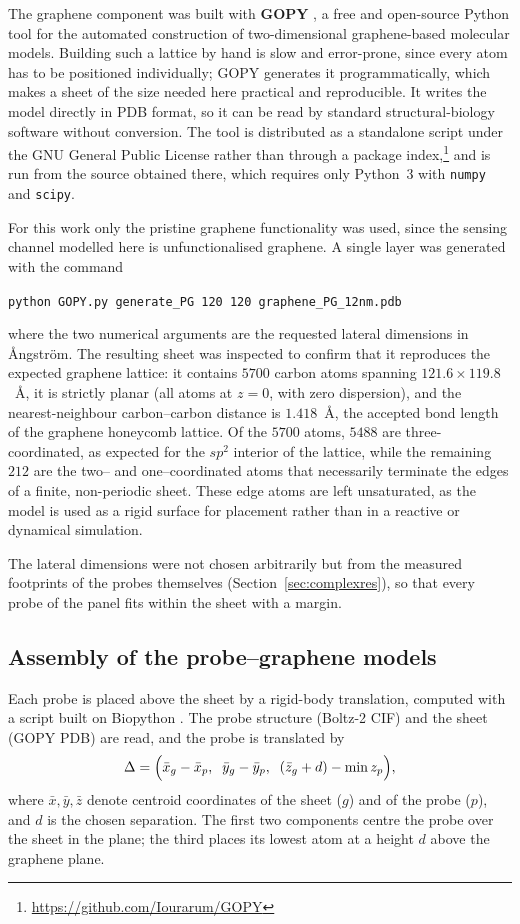 The graphene component was built with \textbf{GOPY} \citep{muraru2020}, a free and open-source
Python tool for the automated construction of two-dimensional graphene-based molecular models.
Building such a lattice by hand is slow and error-prone, since every atom has to be positioned
individually; GOPY generates it programmatically, which makes a sheet of the size needed here
practical and reproducible. It writes the model directly in PDB format, so it can be read by
standard structural-biology software without conversion. The tool is distributed as a standalone
script under the GNU General Public License rather than through a package
index,\footnote{\url{https://github.com/Iourarum/GOPY}} and is run from the source obtained there,
which requires only Python~3 with \texttt{numpy} and \texttt{scipy}.

For this work only the pristine graphene functionality was used, since the sensing channel modelled
here is unfunctionalised graphene. A single layer was generated with the command
\begin{center}
\texttt{python GOPY.py generate\_PG 120 120 graphene\_PG\_12nm.pdb}
\end{center}
where the two numerical arguments are the requested lateral dimensions in \AA{}ngstr\"om. The
resulting sheet was inspected to confirm that it reproduces the expected graphene lattice: it
contains $5700$ carbon atoms spanning $121.6 \times 119.8$~\AA{}, it is strictly planar (all atoms
at $z = 0$, with zero dispersion), and the nearest-neighbour carbon--carbon distance is
$1.418$~\AA{}, the accepted bond length of the graphene honeycomb lattice. Of the $5700$ atoms,
$5488$ are three-coordinated, as expected for the $sp^2$ interior of the lattice, while the
remaining $212$ are the two-- and one--coordinated atoms that necessarily terminate the edges of a
finite, non-periodic sheet. These edge atoms are left unsaturated, as the model is used as a rigid
surface for placement rather than in a reactive or dynamical simulation.

The lateral dimensions were not chosen arbitrarily but from the measured footprints of the probes
themselves (Section~\ref{sec:complexres}), so that every probe of the panel fits within the sheet
with a margin.

\subsection{Assembly of the probe--graphene models}

Each probe is placed above the sheet by a rigid-body translation, computed with a script built on
Biopython \citep{cock2009}. The probe structure (Boltz-2 CIF) and the sheet
(GOPY PDB) are read, and the probe is translated by
\[
\Delta = \Bigl(\bar{x}_{g}-\bar{x}_{p},\;\;
               \bar{y}_{g}-\bar{y}_{p},\;\;
               (\bar{z}_{g}+d) - \min z_{p}\Bigr),
\]
where $\bar{x},\bar{y},\bar{z}$ denote centroid coordinates of the sheet ($g$) and of the probe
($p$), and $d$ is the chosen separation. The first two components centre the probe over the sheet
in the plane; the third places its lowest atom at a height $d$ above the graphene plane.

